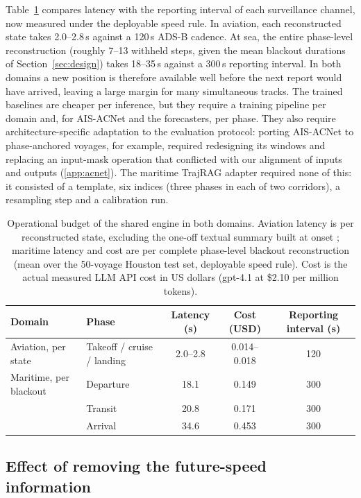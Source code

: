 Table~\ref{tab:latency} compares latency with the reporting interval of each
surveillance channel, now measured under the deployable speed rule. In
aviation, each reconstructed state takes 2.0--2.8\,s against a 120\,s ADS-B
cadence. At sea, the entire phase-level reconstruction (roughly 7--13
withheld steps, given the mean blackout durations of
Section~\ref{sec:design}) takes 18--35\,s against a 300\,s reporting
interval. In both
domains a new position is therefore available well before the next report
would have arrived, leaving a large margin for many simultaneous tracks.
The trained baselines are cheaper per inference, but they require a
training pipeline per domain and, for AIS-ACNet and the forecasters, per
phase. They also require architecture-specific adaptation to the evaluation
protocol: porting AIS-ACNet to phase-anchored voyages, for example,
required redesigning its windows and replacing an input-mask operation that
conflicted with our alignment of inputs and outputs (\ref{app:acnet}). The
maritime TrajRAG adapter required none of this: it consisted of a template,
six indices (three phases in each of two corridors), a resampling step and
a calibration run.

\begin{table}[t]
\centering
\caption{Operational budget of the shared engine in both domains. Aviation
latency is per reconstructed state, excluding the one-off textual summary
built at onset \citep{felendler2026trajrag}; maritime latency and cost are
per complete phase-level blackout reconstruction (mean over the 50-voyage
Houston test set, deployable speed rule). Cost is the actual measured LLM
API cost in US dollars (gpt-4.1 at \$2.10 per million tokens).}
\label{tab:latency}
\footnotesize
\begin{tabular}{llccc}
\toprule
Domain & Phase & Latency (s) & Cost (USD) & Reporting interval (s) \\
\midrule
Aviation, per state & Takeoff / cruise / landing & 2.0--2.8 & 0.014--0.018 & 120 \\
Maritime, per blackout & Departure & 18.1 & 0.149 & 300 \\
 & Transit & 20.8 & 0.171 & 300 \\
 & Arrival & 34.6 & 0.453 & 300 \\
\bottomrule
\end{tabular}
\end{table}

\subsection{Effect of removing the future-speed information}
\label{sec:r1-result}

